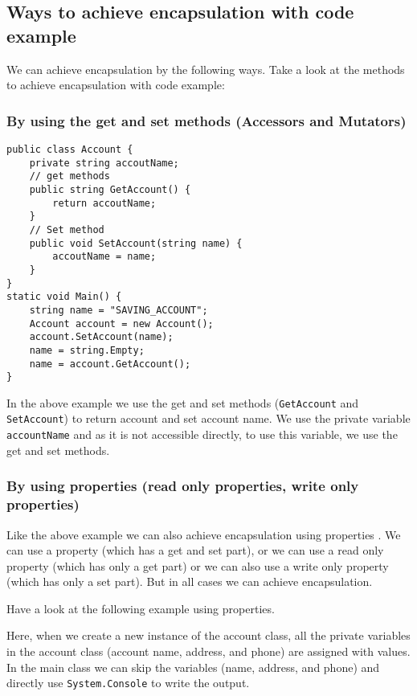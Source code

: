 \subsection*{Ways to achieve encapsulation with code example}

We can achieve encapsulation by the following ways. Take a look at the methods to
achieve encapsulation with code example:

\subsubsection*{By using the get and set methods (Accessors and Mutators)}
\begin{lstlisting}[caption=Encapsulation using get and set methods]
public class Account {
	private string accoutName;
	// get methods
	public string GetAccount() {
		return accoutName;
	}
	// Set method
	public void SetAccount(string name) {
		accoutName = name;
	}
}
static void Main() {
	string name = "SAVING_ACCOUNT";
	Account account = new Account();
	account.SetAccount(name);
	name = string.Empty;
	name = account.GetAccount();
}
\end{lstlisting}

In the above example we use the get and set methods (\texttt{GetAccount} and \texttt{SetAccount})
to return account and set account name. We use the private variable \texttt{accountName} and
as it is not accessible directly, to use this variable, we use the get and set methods.

\subsubsection*{By using properties (read only properties, write only properties)}
Like the above example we can also achieve encapsulation using properties . We can use
a property (which has a get and set part), or we can use a read only property (which has
only a get part) or we can also use a write only property (which has only a set part). But in
all cases we can achieve encapsulation.

Have a look at the following example using properties.



Here, when we create a new instance of the account class, all the private variables in the
account class (account name, address, and phone) are assigned with values. In the main
class we can skip the variables (name, address, and phone) and directly
use \texttt{System.Console} to write the output.

